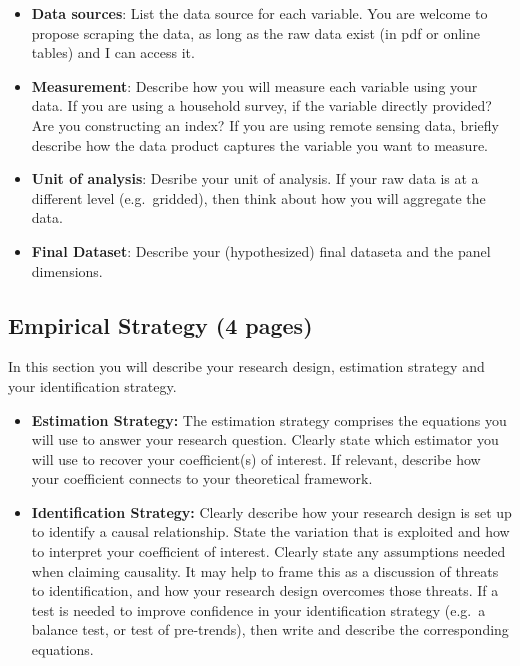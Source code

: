 \documentclass[
]{article}
\begin{document}
\begin{itemize}
\item
  \textbf{Data sources}: List the data source for each variable. You are welcome to propose scraping the data, as long as the raw data exist (in pdf or online tables) and I can access it.
\item
  \textbf{Measurement}: Describe how you will measure each variable using your data. If you are using a household survey, if the variable directly provided? Are you constructing an index? If you are using remote sensing data, briefly describe how the data product captures the variable you want to measure.
\item
  \textbf{Unit of analysis}: Desribe your unit of analysis. If your raw data is at a different level (e.g.~gridded), then think about how you will aggregate the data.
\item
  \textbf{Final Dataset}: Describe your (hypothesized) final dataseta and the panel dimensions.
\end{itemize}

\hypertarget{empirical-strategy-4-pages}{%
\subsection{Empirical Strategy (4 pages)}\label{empirical-strategy-4-pages}}

In this section you will describe your research design, estimation strategy and your identification strategy.

\begin{itemize}
\item
  \textbf{Estimation Strategy:} The estimation strategy comprises the equations you will use to answer your research question. Clearly state which estimator you will use to recover your coefficient(s) of interest. If relevant, describe how your coefficient connects to your theoretical framework.
\item
  \textbf{Identification Strategy:} Clearly describe how your research design is set up to identify a causal relationship. State the variation that is exploited and how to interpret your coefficient of interest. Clearly state any assumptions needed when claiming causality. It may help to frame this as a discussion of threats to identification, and how your research design overcomes those threats. If a test is needed to improve confidence in your identification strategy (e.g.~a balance test, or test of pre-trends), then write and describe the corresponding equations.
\end{itemize}
\end{document}
